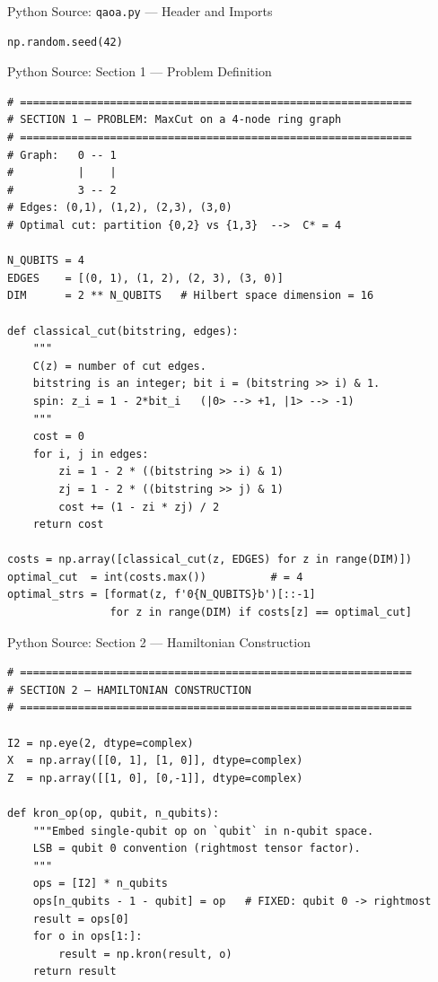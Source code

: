 \documentclass{beamer}
\begin{document}
\begin{frame}
\begin{frame}{Python Source: \texttt{qaoa.py} --- Header and Imports}
\begin{verbatim}
np.random.seed(42)
\end{verbatim}
\end{frame}


\begin{frame}{Python Source: Section 1 — Problem Definition}
\footnotesize
\begin{verbatim}
# =============================================================
# SECTION 1 — PROBLEM: MaxCut on a 4-node ring graph
# =============================================================
# Graph:   0 -- 1
#          |    |
#          3 -- 2
# Edges: (0,1), (1,2), (2,3), (3,0)
# Optimal cut: partition {0,2} vs {1,3}  -->  C* = 4

N_QUBITS = 4
EDGES    = [(0, 1), (1, 2), (2, 3), (3, 0)]
DIM      = 2 ** N_QUBITS   # Hilbert space dimension = 16

def classical_cut(bitstring, edges):
    """
    C(z) = number of cut edges.
    bitstring is an integer; bit i = (bitstring >> i) & 1.
    spin: z_i = 1 - 2*bit_i   (|0> --> +1, |1> --> -1)
    """
    cost = 0
    for i, j in edges:
        zi = 1 - 2 * ((bitstring >> i) & 1)
        zj = 1 - 2 * ((bitstring >> j) & 1)
        cost += (1 - zi * zj) / 2
    return cost

costs = np.array([classical_cut(z, EDGES) for z in range(DIM)])
optimal_cut  = int(costs.max())          # = 4
optimal_strs = [format(z, f'0{N_QUBITS}b')[::-1]
                for z in range(DIM) if costs[z] == optimal_cut]
\end{verbatim}
\end{frame}


\begin{frame}{Python Source: Section 2 — Hamiltonian Construction}
\footnotesize
\begin{verbatim}
# =============================================================
# SECTION 2 — HAMILTONIAN CONSTRUCTION
# =============================================================

I2 = np.eye(2, dtype=complex)
X  = np.array([[0, 1], [1, 0]], dtype=complex)
Z  = np.array([[1, 0], [0,-1]], dtype=complex)

def kron_op(op, qubit, n_qubits):
    """Embed single-qubit op on `qubit` in n-qubit space.
    LSB = qubit 0 convention (rightmost tensor factor).
    """
    ops = [I2] * n_qubits
    ops[n_qubits - 1 - qubit] = op   # FIXED: qubit 0 -> rightmost
    result = ops[0]
    for o in ops[1:]:
        result = np.kron(result, o)
    return result


\end{verbatim}
\end{frame}
\end{frame}
\end{document}
